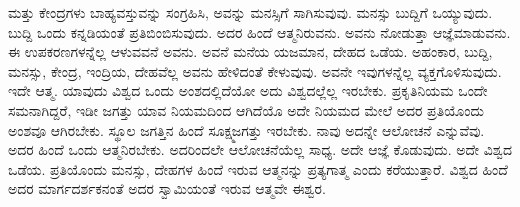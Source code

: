 ಮತ್ತು ಕೇಂದ್ರಗಳು ಬಾಹ್ಯವಸ್ತುವನ್ನು ಸಂಗ್ರಹಿಸಿ, ಅವನ್ನು ಮನಸ್ಸಿಗೆ ಸಾಗಿಸುವುವು. ಮನಸ್ಸು ಬುದ್ದಿಗೆ ಒಯ್ಯುವುದು. ಬುದ್ದಿ ಒಂದು ಕನ್ನಡಿಯಂತೆ ಪ್ರತಿಬಿಂಬಿಸುವುದು. ಅದರ ಹಿಂದೆ ಆತ್ಮನಿರುವನು. ಅವನು ನೋಡುತ್ತಾ ಆಜ್ಞೆಮಾಡುವನು. ಈ ಉಪಕರಣಗಳನ್ನೆಲ್ಲ ಆಳುವವನೆ ಅವನು. ಅವನೆ ಮನೆಯ ಯಜಮಾನ, ದೇಹದ ಒಡೆಯ. ಅಹಂಕಾರ, ಬುದ್ದಿ, ಮನಸ್ಸು, ಕೇಂದ್ರ, ಇಂದ್ರಿಯ, ದೇಹವೆಲ್ಲ ಅವನು ಹೇಳಿದಂತೆ ಕೇಳುವುವು. ಅವನೇ ಇವುಗಳನ್ನೆಲ್ಲ ವ್ಯಕ್ತಗೊಳಿಸುವುದು. ಇದೇ ಆತ್ಮ. ಯಾವುದು ವಿಶ್ವದ ಒಂದು ಅಂಶದಲ್ಲಿದೆಯೋ ಅದು ವಿಶ್ವದಲ್ಲೆಲ್ಲ ಇರಬೇಕು. ಪ್ರಕೃತಿನಿಯಮ ಒಂದೇ ಸಮನಾಗಿದ್ದರೆ, ಇಡೀ ಜಗತ್ತು ಯಾವ ನಿಯಮದಿಂದ ಆಗಿದೆಯೊ ಅದೇ ನಿಯಮದ ಮೇಲೆ ಅದರ ಪ್ರತಿಯೊಂದು ಅಂಶವೂ ಆಗಿರಬೇಕು. ಸ್ಥೂಲ ಜಗತ್ತಿನ ಹಿಂದೆ ಸೂಕ್ಷ್ಮಜಗತ್ತು ಇರಬೇಕು. ನಾವು ಅದನ್ನೇ ಆಲೋಚನೆ ಎನ್ನುವೆವು. ಅದರ ಹಿಂದೆ ಒಂದು ಆತ್ಮನಿರಬೇಕು. ಅದರಿಂದಲೇ ಆಲೋಚನೆಯೆಲ್ಲ ಸಾಧ್ಯ. ಅದೇ ಆಜ್ಞೆ ಕೊಡುವುದು. ಅದೇ ವಿಶ್ವದ ಒಡೆಯ. ಪ್ರತಿಯೊಂದು ಮನಸ್ಸು, ದೇಹಗಳ ಹಿಂದೆ ಇರುವ ಆತ್ಮನನ್ನು ಪ್ರತ್ಯಗಾತ್ಮ ಎಂದು ಕರೆಯುತ್ತಾರೆ. ವಿಶ್ವದ ಹಿಂದೆ ಅದರ ಮಾರ್ಗದರ್ಶಕನಂತೆ ಅದರ ಸ್ವಾಮಿಯಂತೆ ಇರುವ ಆತ್ಮವೇ ಈಶ್ವರ.


